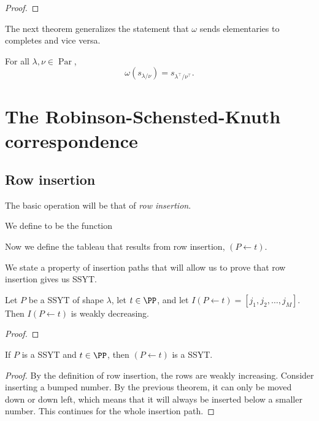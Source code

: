 \documentclass{article}
\DeclareMathOperator{\Par}{Par}
\begin{document}
\begin{proof}
\end{proof}

The next theorem generalizes the statement that $\omega$ sends elementaries to completes and vice versa.

\begin{theorem}
    For all $\lambda,\nu \in \Par$,
    \[
        \omega(s_{\lambda/\nu}) = s_{\lambda^\top/\nu^\top}.
    \]
\end{theorem}

\section{The Robinson-Schensted-Knuth correspondence}

\subsection{Row insertion}


The basic operation will be that of \textit{row insertion}.

\begin{definition}
    \ytabsmallbox
    We define  to be the function 
\end{definition}

Now we define the tableau that results from row insertion, $(P \leftarrow t)$.

We state a property of insertion paths that will allow us to prove that row insertion gives us SSYT.

\begin{theorem}
    Let $P$ be a SSYT of shape $\lambda$, let $t \in \PP$, and let $I(P\leftarrow t) = [j_1,j_2,\ldots,j_M]$. Then $I(P\leftarrow t)$ is weakly decreasing.
\end{theorem}

\begin{proof}
\end{proof}

\begin{corollary}\label{InsertionPreservesSSYT}
    If $P$ is a SSYT and $t \in \PP$, then $(P \leftarrow t)$ is a SSYT.
\end{corollary}

\begin{proof}
    By the definition of row insertion, the rows are weakly increasing. Consider inserting a bumped number. By the previous theorem, it can only be moved down or down left, which means that it will always be inserted below a smaller number. This continues for the whole insertion path.
\end{proof}
\end{document}
